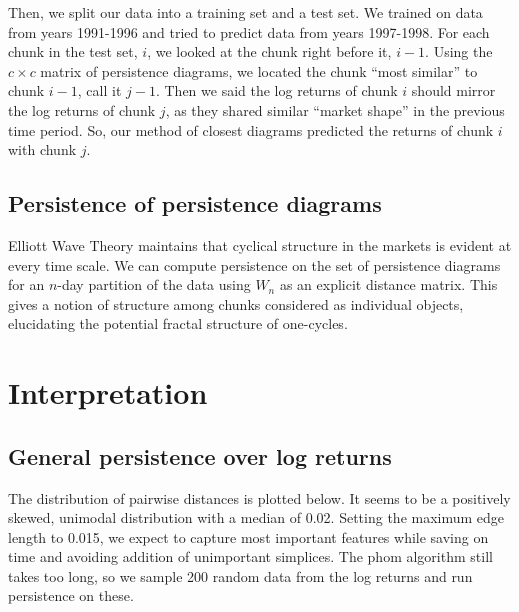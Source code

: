\documentclass{article}
\begin{document}
Then, we split our data into a training set and a test set. We trained on data from years 1991-1996 and tried to predict data from years 1997-1998. For each chunk in the test set, $i$, we looked at the chunk right before it, $i-1$. Using the $c \times c$ matrix of persistence diagrams, we located the chunk “most similar” to chunk $i-1$, call it $j-1$. Then we said the log returns of chunk $i$ should mirror the log returns of chunk $j$, as they shared similar “market shape” in the previous time period. So, our method of closest diagrams predicted the returns of chunk $i$ with chunk $j$. 


\subsection{Persistence of persistence diagrams}
Elliott Wave Theory maintains that cyclical structure in the markets is evident at every time scale. We can compute persistence on the set of persistence diagrams for an $n$-day partition of the data using $W_n$ as an explicit distance matrix. This gives a notion of structure among chunks considered as individual objects, elucidating the potential fractal structure of one-cycles.


\section{Interpretation}

\subsection{General persistence over log returns}

The distribution of pairwise distances is plotted below. It seems to be a positively skewed, unimodal distribution with a median of 0.02. Setting the maximum edge length to 0.015, we expect to capture most important features while saving on time and avoiding addition of unimportant simplices. The phom algorithm still takes too long, so we sample 200 random data from the log returns and run persistence on these.
\end{document}
